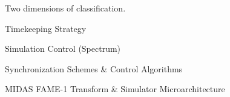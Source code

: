 Two dimensions of classification.

Timekeeping Strategy

Simulation Control (Spectrum)

Synchronization Schemes \& Control Algorithms

MIDAS FAME-1 Transform \& Simulator Microarchitecture

